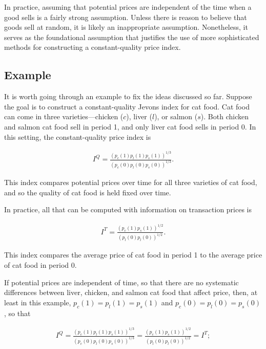 \documentclass[]{article}
\begin{document}
In practice, assuming that potential prices are independent of the time when a good sells is a fairly strong assumption. Unless there is reason to believe that goods sell at random, it is likely an inappropriate assumption. Nonetheless, it serves as the foundational assumption that justifies the use of more sophisticated methods for constructing a constant-quality price index.

\hypertarget{example}{%
\subsection{Example}\label{example}}

It is worth going through an example to fix the ideas discussed so far. Suppose the goal is to construct a constant-quality Jevons index for cat food. Cat food can come in three varieties---chicken (\(c\)), liver (\(l\)), or salmon (\(s\)). Both chicken and salmon cat food sell in period 1, and only liver cat food sells in period 0. In this setting, the constant-quality price index is

\begin{align*}
I^{Q} = \frac{(p_{c}(1) p_{l}(1) p_{s}(1))^{1 / 3}}{(p_{c}(0) p_{l}(0) p_{s}(0))^{1 / 3}}.
\end{align*}

This index compares potential prices over time for all three varieties of cat food, and so the quality of cat food is held fixed over time.

In practice, all that can be computed with information on transaction prices is

\begin{align*}
I^{T} = \frac{(p_{c}(1) p_{s}(1))^{1 / 2}}{(p_{l}(0) p_{l}(0))^{1 / 2}}.
\end{align*}

This index compares the average price of cat food in period 1 to the average price of cat food in period 0.

If potential prices are independent of time, so that there are no systematic differences between liver, chicken, and salmon cat food that affect price, then, at least in this example, \(p_{c}(1) = p_{l}(1) = p_{s}(1)\) and \(p_{c}(0) = p_{l}(0) = p_{s}(0)\), so that

\begin{align*}
I^{Q} = \frac{(p_{c}(1) p_{l}(1) p_{s}(1))^{1 / 3}}{(p_{c}(0) p_{l}(0) p_{s}(0))^{1 / 3}} = \frac{(p_{c}(1) p_{s}(1))^{1 / 2}}{(p_{l}(0) p_{l}(0))^{1 / 2}} = I^{T};
\end{align*}
\end{document}
